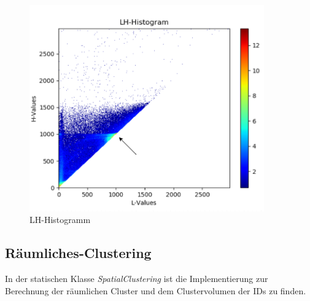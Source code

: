 \begin{figure}[H] 
\includegraphics[width=0.9\textwidth]{Logos/LHHistogram_a.png}
\caption{LH-Histogramm} 
\label{fig:lh_histo} 
\end{figure}



\subsection{Räumliches-Clustering}

In der statischen Klasse \textit{SpatialClustering} ist die Implementierung zur Berechnung der räumlichen Cluster und dem Clustervolumen der IDs zu finden.


